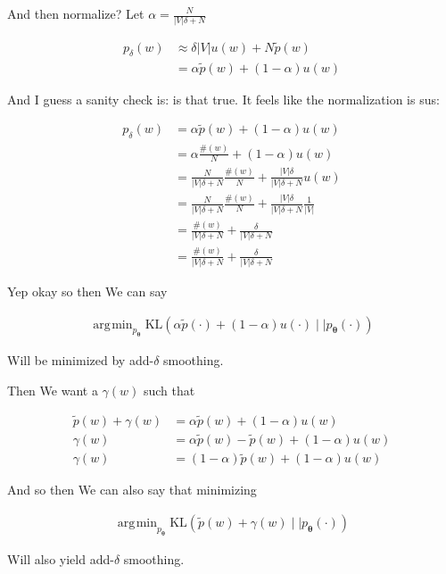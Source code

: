 \documentclass{article}
\DeclareMathOperator*{\argmin}{\arg\!\min}
\newcommand{\KL}{\mathrm{KL}}
\newcommand{\vtheta}{\boldsymbol{\theta}}
\newcommand{\model}{p_{\vtheta}}
\begin{document}
		And then normalize? Let $\alpha = \frac{N}{|V|\delta + N}$
		
		\begin{align}
			p_\delta(w) &\approx \delta|V|u(w) + N\tilde{p}(w)\\
			&= \alpha\tilde{p}(w) + (1-\alpha)u(w) 
		\end{align}
		
		And I guess a sanity check is: is that true. It feels like the normalization is sus:
		
		\begin{align}
			p_\delta(w) &= \alpha\tilde{p}(w) + (1-\alpha)u(w) \\
			&= \alpha\frac{\#(w)}{N} + (1-\alpha)u(w)\\
			&= \frac{N}{|V|\delta + N}\frac{\#(w)}{N} + \frac{|V|\delta}{|V|\delta + N}u(w)\\
			&= \frac{N}{|V|\delta + N}\frac{\#(w)}{N} + \frac{|V|\delta}{|V|\delta + N}\frac{1}{|V|}\\
			&= \frac{\#(w)}{|V|\delta + N} + \frac{\delta}{|V|\delta + N}\\
			&= \frac{\#(w)}{|V|\delta + N} + \frac{\delta}{|V|\delta + N}
		\end{align}
		

		 Yep okay so then We can say
	    
	    \begin{align}
	    	\argmin_{\model}\KL(\alpha\tilde{p}(\cdot) + (1-\alpha)u(\cdot) \mid\mid \model(\cdot))
	    \end{align}		
	    
	    Will be minimized by add-$\delta$ smoothing.
	    
		Then We want a $\gamma(w)$ such that
		
		\begin{align}
			\tilde{p}(w) + \gamma(w) &= \alpha\tilde{p}(w) + (1-\alpha)u(w)\\
			\gamma(w) &= \alpha\tilde{p}(w) - \tilde{p}(w) + (1-\alpha)u(w)\\
			\gamma(w) &= (1-\alpha)\tilde{p}(w) + (1-\alpha)u(w)
		\end{align}
		
		And so then We can also say that minimizing
		
		\begin{align}
	    	\argmin_{\model}\KL( \tilde{p}(w) + \gamma(w) \mid\mid \model(\cdot))
	    \end{align}
	    
	    Will also yield add-$\delta$ smoothing.
	    
\end{document}
